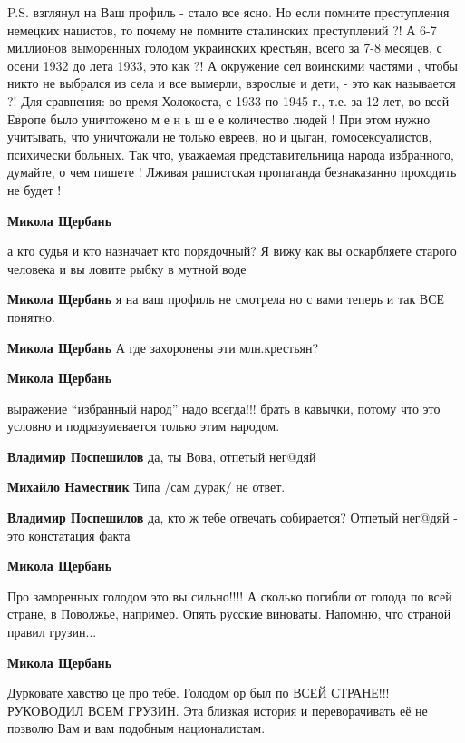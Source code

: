 \begin{itemize}
\begin{itemize}
\begin{itemize}
P.S. взглянул на Ваш профиль - стало все ясно. Но если помните преступления
немецких нацистов, то почему не помните сталинских преступлений ?! А 6-7
миллионов выморенных голодом украинских крестьян, всего за 7-8 месяцев, с
осени 1932 до лета 1933, это как ?! А окружение сел воинскими частями , чтобы
никто не выбрался из села и все вымерли, взрослые и дети, - это как называется
?! Для сравнения: во время Холокоста, с 1933 по 1945 г., т.е. за 12 лет, во
всей Европе было уничтожено м е н ь ш е е количество людей ! При этом нужно
учитывать, что уничтожали не только евреев, но и цыган, гомосексуалистов,
психически больных. Так что, уважаемая представительница народа избранного,
думайте, о чем пишете ! Лживая рашистская пропаганда безнаказанно проходить не
будет !

\textbf{Микола Щербань} 

а кто судья и кто назначает кто порядочный? Я вижу как вы оскарбляете старого
человека и вы ловите рыбку в мутной воде

\textbf{Микола Щербань} я на ваш профиль не смотрела но с вами теперь и так ВСЕ понятно.

\textbf{Микола Щербань} А где захоронены эти млн.крестьян?

\textbf{Микола Щербань} 

выражение \enquote{избранный народ} надо всегда!!! брать в кавычки, потому что
это условно и подразумевается только этим народом.

\textbf{Владимир Поспешилов} да, ты Вова, отпетый нег@дяй

\textbf{Михайло Наместник} Типа /сам дурак/ не ответ.

\textbf{Владимир Поспешилов} да, кто ж тебе отвечать собирается? Отпетый нег@дяй - это констатация факта

\textbf{Микола Щербань} 

Про заморенных голодом это вы сильно!!!! А сколько погибли от голода по всей
стране, в Поволжье, например. Опять русские виноваты. Напомню, что страной
правил грузин...

\textbf{Микола Щербань} 

Дурковате хавство це про тебе. Голодом ор был по ВСЕЙ СТРАНЕ!!! РУКОВОДИЛ ВСЕМ
ГРУЗИН. Эта близкая история и переворачивать её не позволю Вам и вам подобным
националистам.


\end{itemize}
\end{itemize}
\end{itemize}
